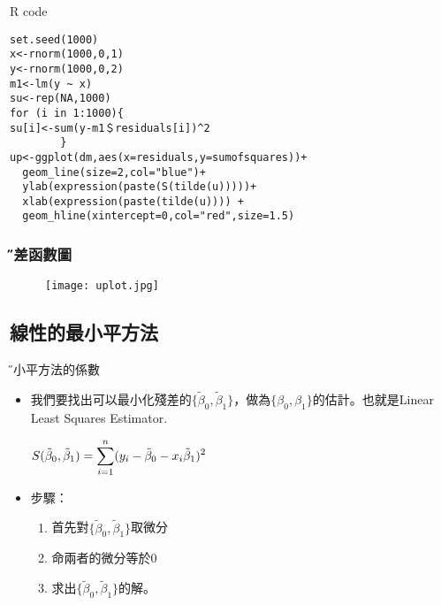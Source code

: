 \documentclass[xcolor=dvipsnames]{beamer}
\begin{document}
\begin{frame}[fragile=singleslide]{R code}
\begin{Verbatim}[frame=single,label=R code,
formatcom=\color{blue},fontseries=b,xleftmargin=2mm]
set.seed(1000)
x<-rnorm(1000,0,1)
y<-rnorm(1000,0,2)
m1<-lm(y ~ x)
su<-rep(NA,1000)
for (i in 1:1000){
su[i]<-sum(y-m1＄residuals[i])^2
		}
up<-ggplot(dm,aes(x=residuals,y=sumofsquares))+
  geom_line(size=2,col="blue")+
  ylab(expression(paste(S(tilde(u)))))+
  xlab(expression(paste(tilde(u)))) +
  geom_hline(xintercept=0,col="red",size=1.5)
\end{Verbatim}
\end{frame}

\begin{frame}\frametitle{\H 殘差函數圖}
\begin{figure}
\begin{center}
\texttt{[image: uplot.jpg]}
\end{center}
\end{figure}
\end{frame}
\subsection{線性的最小平方法}
\begin{frame}{\H 最小平方法的係數}
\begin{itemize}
\item 我們要找出可以最小化殘差的$\{\tilde{\beta}_{0},\tilde{\beta}_{1}\}$，做為$\{\beta_{0},\beta_{1}\}$的估計。也就是Linear Least Squares Estimator.
\begin{center}
$S(\tilde{\beta}_{0},\tilde{\beta}_{1})=\mathlarger {\sum\limits_{i=1}^n(y_{i}-\tilde{\beta}_{0}-x_{i}\tilde{\beta}_{1})^2}$
\end{center}
\item 步驟：
\begin{enumerate}
\item 首先對$\{\tilde{\beta}_{0},\tilde{\beta}_{1}\}$取微分
\item 命兩者的微分等於0
\item 求出$\{\tilde{\beta}_{0},\tilde{\beta}_{1}\}$的解。
\end{enumerate}
\end{itemize}
\end{frame}
\end{document}
